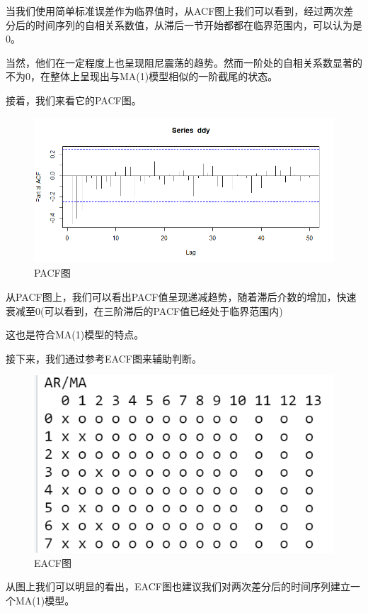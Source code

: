 \documentclass{article}
\begin{document}
	当我们使用简单标准误差作为临界值时，从ACF图上我们可以看到，经过两次差分后的时间序列的自相关系数值，从滞后一节开始都都在临界范围内，可以认为是0。
	
	当然，他们在一定程度上也呈现阻尼震荡的趋势。然而一阶处的自相关系数显著的不为0，在整体上呈现出与MA(1)模型相似的一阶截尾的状态。
	
	
	接着，我们来看它的PACF图。
	
		\begin{figure}[h]
		\centering
		\includegraphics[width=.9\textwidth]{Rplot05.png}
		\caption{PACF图}
	\end{figure}
	
	从PACF图上，我们可以看出PACF值呈现递减趋势，随着滞后介数的增加，快速衰减至0(可以看到，在三阶滞后的PACF值已经处于临界范围内)
	
	这也是符合MA(1)模型的特点。
	
	接下来，我们通过参考EACF图来辅助判断。
	
		\begin{figure}[h]
		\centering
		\includegraphics[width=.9\textwidth]{Rplot06.png}
		\caption{EACF图}
	\end{figure}
	
	从图上我们可以明显的看出，EACF图也建议我们对两次差分后的时间序列建立一个MA(1)模型。
	
\end{document}
